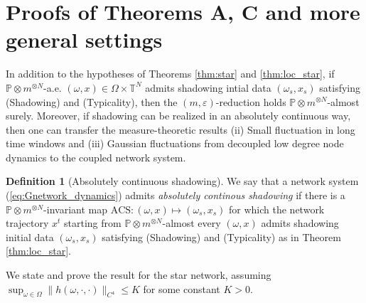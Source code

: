 \documentclass[a4paper]{article}
\theoremstyle{plain}
\theoremstyle{definition}
\newtheorem{defn}[theorem]{Definition}%
\newcommand{\PP}{\mathbb{P}}
\newcommand{\T}{\mathbb{T}}
\begin{document}
\section{Proofs of Theorems A, C and more general settings}
\label{appendix:ac_shad}

In addition to the hypotheses of Theorems \ref{thm:star} and \ref{thm:loc_star}, if $\PP\otimes m^{\otimes N}$-a.e. $(\omega,x)\in\Omega\times \T^N$ admits shadowing intial data $(\omega_{{s}},x_{{s}})$ satisfying (Shadowing) and (Typicality), then the $(m,\varepsilon)$-reduction holds $\PP\otimes m^{\otimes N}$-almost surely. 
Moreover, if shadowing can be realized in an absolutely continuous way, then one can transfer the measure-theoretic results (ii) Small fluctuation in long time windows and (iii) Gaussian fluctuations from decoupled low degree node dynamics to the coupled network system. %


\begin{defn}[Absolutely continuous shadowing]
	We say that a network system (\ref{eq:Gnetwork_dynamics}) admits \textit{absolutely continous shadowing} if there is a $\PP\otimes m^{\otimes N}$-invariant map $\mathrm{ACS}:(\omega,x)\mapsto (\omega_{{s}},x_{{s}})$ for which the network trajectory $x^t$ starting from $\PP\otimes m^{\otimes N}$-almost every $(\omega,x)$ admits shadowing initial data $(\omega_{{s}},x_{{s}})$ satisfying (Shadowing) and (Typicality) as in Theorem \ref{thm:loc_star}.
\end{defn}



We state and prove the result for the star network, assuming $\sup_{\omega\in\Omega} \|h(\omega,\cdot,\cdot)\|_{C^4}\leq K$ for some constant $K>0$.
\end{document}
